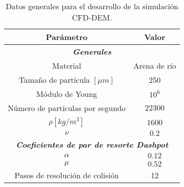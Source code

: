 \begin{table}[h!]
	\centering
	\begin{adjustbox}{max width = 0.5\textwidth}
	\begin{tabular}{|c|c|}
		\hline
		\textbf{Par\'ametro} & \textbf{Valor} \\ \hline
		\multicolumn{2}{|c|}{\textbf{\textit{Generales}}} \\ \hline
		Material & Arena de r\'io \\ \hline
		Tama\~no de part\'icula $[\mu m]$ & 250 \\ \hline
		M\'odulo de Young & $10 ^6$ \\ \hline
		 N\'umero de part\'iculas por segundo & $22300$ \\
		  \hline
		 $\rho [kg/m^3]$ & 1600 \\ \hline
		 $\nu$ & $0.2$ \\ \hline
		 \multicolumn{2}{|c|}{\textbf{\textit{Coeficientes de par de resorte Dashpot}}} \\ \hline
		 $\alpha$ & $0.12$ \\ \hline
		 $\mu$ & $0.52$ \\ \hline
		 Pasos de resoluci\'on de colisi\'on & 12 \\ \hline
	\end{tabular}
	\end{adjustbox}
	\caption{Datos generales para el desarrollo de la simulaci\'on CFD-DEM.}
	\label{CFDEMdata}
\end{table}

\newpage

